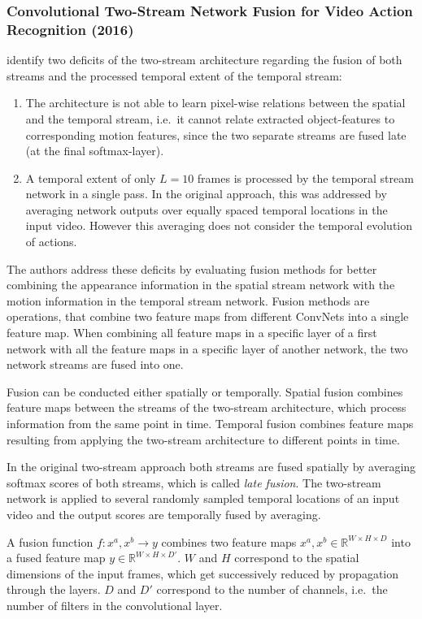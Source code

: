 \subsubsection{Convolutional Two-Stream Network Fusion for Video Action Recognition (2016)}
\textcite{feichtenhofer_convolutional_2016} identify two deficits of the two-stream architecture\cite{simonyan_two-stream_2014} regarding the fusion of both streams and the processed temporal extent of the temporal stream:
\begin{enumerate}
    \item The architecture is not able to learn pixel-wise relations between the spatial and the temporal stream, i.e.\ it cannot relate extracted object-features to corresponding motion features, since the two separate streams are fused late (at the final softmax-layer).
    \item A temporal extent of only $L = 10$ frames is processed by the temporal stream network in a single pass. In the original approach, this was addressed by averaging network outputs over equally spaced temporal locations in the input video. However this averaging does not consider the temporal evolution of actions.
\end{enumerate}

The authors address these deficits by evaluating fusion methods for better combining the appearance information in the spatial stream network with the motion information in the temporal stream network.
Fusion methods are operations, that combine two feature maps from different ConvNets into a single feature map.
When combining all feature maps in a specific layer of a first network with all the feature maps in a specific layer of another network, the two network streams are fused into one.

Fusion can be conducted either spatially or temporally.
Spatial fusion combines feature maps between the streams of the two-stream architecture, which process information from the same point in time.
Temporal fusion combines feature maps resulting from applying the two-stream architecture to different points in time.

In the original two-stream approach \cite{simonyan_two-stream_2014} both streams are fused spatially by averaging softmax scores of both streams, which is called \textit{late fusion}.
The two-stream network is applied to several randomly sampled temporal locations of an input video and the output scores are temporally fused by averaging.

A fusion function $f: x^a, x^b \rightarrow y$ combines two feature maps $x^a, x^b \in \mathbb{R}^{W \times H \times D}$ into a fused feature map $y \in \mathbb{R}^{W \times H \times D'}$.
$W$ and $H$ correspond to the spatial dimensions of the input frames, which get successively reduced by propagation through the layers.
$D$ and $D'$ correspond to the number of channels, i.e.\ the number of filters in the convolutional layer. 

